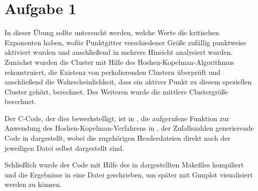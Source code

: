 \section*{Aufgabe 1}
In dieser Übung sollte untersucht werden, welche Werte die kritischen Exponenten
haben, wofür Punktgitter verschiedener Größe zufällig punktweise aktiviert wurden
und anschließend in mehrere Hinsicht analysiert wurden. Zunächst wurden die Cluster
mit Hilfe des Hoshen-Kopelman-Algorithmus rekonstruiert, die Existenz
von perkolierenden Clustern überprüft und anschließend die Wahrscheinlichkeit, dass
ein aktiver Punkt zu diesem speziellen Cluster gehört, berechnet. Des Weiteren
wurde die mittlere Clustergröße berechnet.

Der C-Code, der dies bewerkstelligt, ist in , die aufgerufene
Funktion zur Anwendung des Hoshen-Kopelman-Verfahrens in , der Zufallszahlen
generierende Code in  dargestellt, wobei die zugehörigen Headerdateien 
direkt nach der jeweiligen Datei selbst dargestellt sind.







Schließlich wurde der Code mit Hilfe des in  dargestellten Makefiles
kompiliert und die Ergebnisse in eine Datei geschrieben, um später mit Gnuplot
visualisiert werden zu können.

